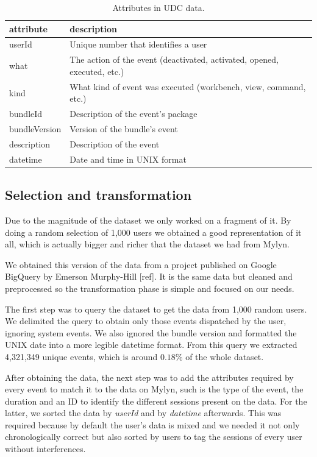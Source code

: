 \documentclass[conference]{IEEEtran}
\begin{document}
\begin{table}[ht!]
\renewcommand{\arraystretch}{1.3}
\caption{Attributes in UDC data. }
\label{tbl:att_udc}
\centering
\begin{tabular}{|p{1.7cm}|p{3.5cm}|} 
  \hline 
attribute & description \\  
  \hline 
    \hline 
userId &  Unique number that identifies a user \\
what & The action of the event (deactivated, activated, opened, executed, etc.)  \\
kind & What kind of event was executed (workbench, view, command, etc.)  \\
bundleId & Description of the event's package  \\
bundleVersion & Version of the bundle's event  \\
description & Description of the event\\
datetime & Date and time in UNIX format\\
  \hline
\end{tabular}

\end{table}

\subsection{Selection and transformation}
Due to the magnitude of the dataset we only worked on a fragment of it. By doing a random selection of 1,000 users we obtained a good representation of it all, which is actually bigger and richer that the dataset we had from Mylyn.

We obtained this version of the data from a project published on Google BigQuery by Emerson Murphy-Hill [ref]. It is the same data but cleaned and preprocessed so the transformation phase is simple and focused on our needs.

The first step was to query the dataset to get the data from 1,000 random users. We delimited the query to obtain only those events dispatched by the user, ignoring system events. We also ignored the bundle version and formatted the UNIX date into a more legible datetime format. From this query we extracted 4,321,349 unique events, which is around $0.18\%$ of the whole dataset.

After obtaining the data, the next step was to add the attributes required by every event to match it to the data on Mylyn, such is the type of the event, the duration and an ID to identify the different sessions present on the data. For the latter, we sorted the data by \textit{userId} and by \textit{datetime} afterwards. This was required because by default the user's data is mixed and we needed it not only chronologically correct but also sorted by users to tag the sessions of every user without interferences. 
\end{document}
